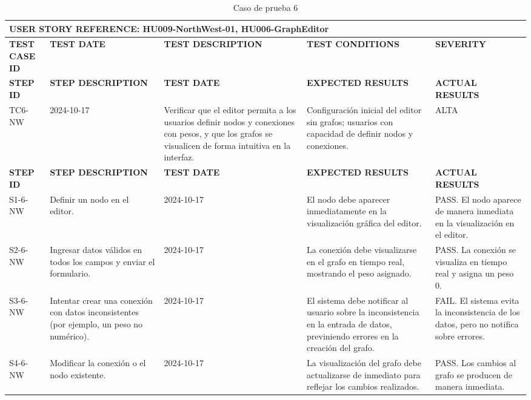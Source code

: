 \small %
\renewcommand{\arraystretch}{1.0} %
\setlength{\tabcolsep}{4pt} %

\begin{longtable}{|p{2cm}|p{3cm}|p{3cm}|p{3cm}|p{3cm}|}
    \caption{Caso de prueba 6} \label{tab:casos_prueba6} \\
    \hline
    \multicolumn{5}{|l|}{\textbf{USER STORY REFERENCE: HU009-NorthWest-01, HU006-GraphEditor}} \\ \hline
    \textbf{TEST CASE ID} & \textbf{TEST DATE} & \textbf{TEST DESCRIPTION} & \textbf{TEST CONDITIONS} & \textbf{SEVERITY} \\ \hline
    \endfirsthead
    \hline
    \textbf{STEP ID} & \textbf{STEP DESCRIPTION} & \textbf{TEST DATE} & \textbf{EXPECTED RESULTS} & \textbf{ACTUAL RESULTS} \\ \hline
    \endhead
    TC6-NW & 2024-10-17 & Verificar que el editor permita a los usuarios definir nodos y conexiones con pesos, y que los grafos se visualicen de forma intuitiva en la interfaz. & Configuración inicial del editor sin grafos; usuarios con capacidad de definir nodos y conexiones. & ALTA \\ \hline
    \textbf{STEP ID} & \textbf{STEP DESCRIPTION} & \textbf{TEST DATE} & \textbf{EXPECTED RESULTS} & \textbf{ACTUAL RESULTS} \\ \hline
    S1-6-NW & Definir un nodo en el editor. & 2024-10-17 & El nodo debe aparecer inmediatamente en la visualización gráfica del editor. & PASS. El nodo aparece de manera inmediata en la visualización en el editor. \\ \hline
    S2-6-NW & Ingresar datos válidos en todos los campos y enviar el formulario. & 2024-10-17 & La conexión debe visualizarse en el grafo en tiempo real, mostrando el peso asignado. & PASS. La conexión se visualiza en tiempo real y asigna un peso 0. \\ \hline
    S3-6-NW & Intentar crear una conexión con datos inconsistentes (por ejemplo, un peso no numérico). & 2024-10-17 & El sistema debe notificar al usuario sobre la inconsistencia en la entrada de datos, previniendo errores en la creación del grafo. & FAIL. El sistema evita la inconsistencia de los datos, pero no notifica sobre errores. \\ \hline
    S4-6-NW & Modificar la conexión o el nodo existente. & 2024-10-17 & La visualización del grafo debe actualizarse de inmediato para reflejar los cambios realizados. & PASS. Los cambios al grafo se producen de manera inmediata. \\ \hline
\end{longtable}

